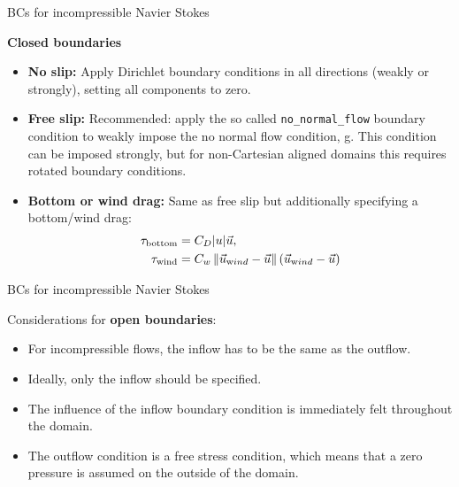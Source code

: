 \documentclass[12pt]{beamer}
\renewcommand\emph[1]{{\bf #1}}
\begin{document}
\begin{frame}{BCs for incompressible Navier Stokes}

  {\bf Closed boundaries}
  \begin{itemize}
    \item {\bf No slip:} Apply Dirichlet boundary conditions in all directions
      (weakly or strongly), setting all components to zero.
    \item {\bf Free slip:} Recommended: apply the so called \lstinline{no_normal_flow}
      boundary condition to weakly impose the no normal flow condition, g.
      This condition can be imposed strongly, but for non-Cartesian aligned
      domains this requires rotated boundary conditions.
    \item {\bf Bottom or wind drag:} Same as free slip but additionally
      specifying a bottom/wind drag:
      \begin{align*}
        \tau_{\text{bottom}} &= C_D |u|\vec u, \\
        \tau_{\text{wind}} &= C_w \left\|\vec u_{\text wind}-\vec u\right\|
        \left(\vec u_{\text wind}-\vec u\right)
      \end{align*}
  \end{itemize}
\end{frame}

\begin{frame}{BCs for incompressible Navier Stokes}

  Considerations for \emph{open boundaries}:
  \begin{itemize}
    \item For incompressible flows, the inflow has to be the same as the outflow. 
    \item Ideally, only the inflow should be specified.
    \item The influence of the inflow boundary condition is immediately felt throughout the domain.
    \item The outflow condition is
  a free stress condition, which means that a zero pressure is assumed on the
  outside of the domain.
  \end{itemize}
\end{frame}
\end{document}
